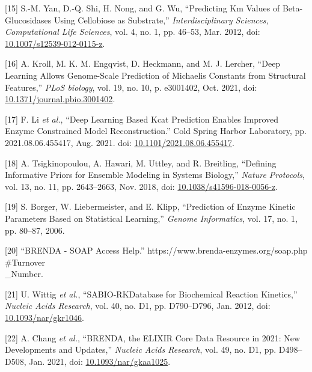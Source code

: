 \documentclass[11pt]{article}
\begin{document}
\hypertarget{citeproc_bib_item_15}{[15] S.-M. Yan, D.-Q. Shi, H. Nong, and G. Wu, “Predicting Km Values of Beta-Glucosidases Using Cellobiose as Substrate,” \textit{Interdisciplinary Sciences, Computational Life Sciences}, vol. 4, no. 1, pp. 46–53, Mar. 2012, doi: \href{https://doi.org/10.1007/s12539-012-0115-z}{10.1007/s12539-012-0115-z}.}

\hypertarget{citeproc_bib_item_16}{[16] A. Kroll, M. K. M. Engqvist, D. Heckmann, and M. J. Lercher, “Deep Learning Allows Genome-Scale Prediction of Michaelis Constants from Structural Features,” \textit{PLoS biology}, vol. 19, no. 10, p. e3001402, Oct. 2021, doi: \href{https://doi.org/10.1371/journal.pbio.3001402}{10.1371/journal.pbio.3001402}.}

\hypertarget{citeproc_bib_item_17}{[17] F. Li \textit{et al.}, “Deep Learning Based Kcat Prediction Enables Improved Enzyme Constrained Model Reconstruction.” Cold Spring Harbor Laboratory, pp. 2021.08.06.455417, Aug. 2021. doi: \href{https://doi.org/10.1101/2021.08.06.455417}{10.1101/2021.08.06.455417}.}

\hypertarget{citeproc_bib_item_18}{[18] A. Tsigkinopoulou, A. Hawari, M. Uttley, and R. Breitling, “Defining Informative Priors for Ensemble Modeling in Systems Biology,” \textit{Nature Protocols}, vol. 13, no. 11, pp. 2643–2663, Nov. 2018, doi: \href{https://doi.org/10.1038/s41596-018-0056-z}{10.1038/s41596-018-0056-z}.}

\hypertarget{citeproc_bib_item_19}{[19] S. Borger, W. Liebermeister, and E. Klipp, “Prediction of Enzyme Kinetic Parameters Based on Statistical Learning,” \textit{Genome Informatics}, vol. 17, no. 1, pp. 80–87, 2006.}

\hypertarget{citeproc_bib_item_20}{[20] “BRENDA - SOAP Access Help.” https://www.brenda-enzymes.org/soap.php\\#Turnover\\_Number.}

\hypertarget{citeproc_bib_item_21}{[21] U. Wittig \textit{et al.}, “SABIO-RK\textemdash Database for Biochemical Reaction Kinetics,” \textit{Nucleic Acids Research}, vol. 40, no. D1, pp. D790–D796, Jan. 2012, doi: \href{https://doi.org/10.1093/nar/gkr1046}{10.1093/nar/gkr1046}.}

\hypertarget{citeproc_bib_item_22}{[22] A. Chang \textit{et al.}, “BRENDA, the ELIXIR Core Data Resource in 2021: New Developments and Updates,” \textit{Nucleic Acids Research}, vol. 49, no. D1, pp. D498–D508, Jan. 2021, doi: \href{https://doi.org/10.1093/nar/gkaa1025}{10.1093/nar/gkaa1025}.}
\end{document}
